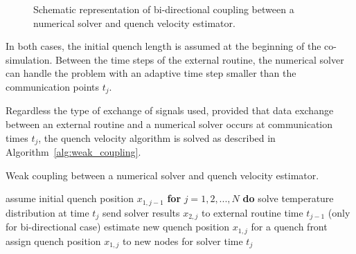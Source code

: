 \begin{figure}[H]
\centering
{}
\caption{Schematic representation of bi-directional coupling between a numerical solver and quench velocity estimator.}
\label{fig:bidirectional_coupling_scheme}
\end{figure}

In both cases, the initial quench length is assumed at the beginning of the co-simulation. Between the time steps of the external routine, the numerical solver can handle the problem with an adaptive time step smaller than the communication points $t_j$.

Regardless the type of exchange of signals used, provided that data exchange between an external routine and a numerical solver occurs at communication times $t_j$, the quench velocity algorithm is solved as described in Algorithm~\ref{alg:weak_coupling}.

\begin{algorithm}[H]
  \caption{Weak coupling between a numerical solver and quench velocity estimator.}
  \label{alg:weak_coupling}
  \begin{algorithmic}[1]
    \STATE assume initial quench position $x_{1,j-1}$ 
    \STATE \textbf{for} $j=1,2,...,N$ \textbf{do}
    \STATE \hspace{0.5cm} solve temperature distribution at time $t_j$
    \STATE \hspace{0.5cm} send solver results $x_{2,j}$ to external routine time $t_{j-1}$ (only for bi-directional case)
    \STATE \hspace{0.5cm} estimate new quench position $x_{1,j}$ for a quench front
    \STATE \hspace{0.5cm} assign quench position $x_{1,j}$ to new nodes for solver time  $t_j$
  \end{algorithmic}
\end{algorithm}

